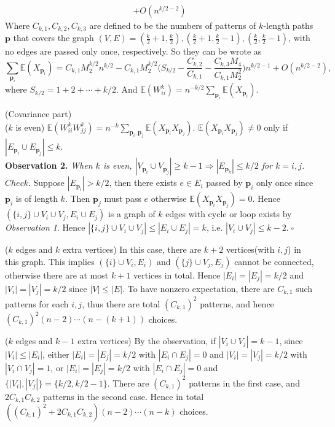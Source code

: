 \begin{answer}
\begin{equation*}
\begin{aligned}
    + O(n^{k/2-2})
\end{aligned}
\end{equation*}
Where $C_{k,1},C_{k,2},C_{k,3}$ are defined to be the numbers of patterns of $k$-length paths $\mathbf{p}$ that covers the graph $(V, E)=(\frac{k}{2}+1,\frac{k}{2}),(\frac{k}{2}+1,\frac{k}{2}-1),(\frac{k}{2},\frac{k}{2}-1)$, with no edges are passed only once, respectively. So they can be wrote as
\begin{equation*}
    \sum_{\mathbf{p}_i}\mathbb{E}(X_{\mathbf{p}_i})=C_{k,1}M_2^{k/2}n^{k/2}-C_{k,1}M_2^{k/2}\Big(S_{k/2}-\frac{C_{k,2}}{C_{k,1}}-\frac{C_{k,3}M_4}{C_{k,1}M_2^2}\Big)n^{k/2-1}+O(n^{k/2-2}),
\end{equation*}
where $S_{k/2}=1+2+\cdots+k/2$. And $\mathbb{E}(W_{ii}^k)=n^{-k/2}\sum_{\mathbf{p}_i}\mathbb{E}(X_{\mathbf{p}_i})$.

(Covariance part)\\
($k$ is even) $\mathbb{E}(W_{ii}^kW_{jj}^k)=n^{-k}\sum_{\mathbf{p}_i,\mathbf{p}_j}\mathbb{E}(X_{\mathbf{p}_i}X_{\mathbf{p}_j})$. $\mathbb{E}(X_{\mathbf{p}_i}X_{\mathbf{p}_j})\neq 0$ only if $|E_{\mathbf{p}_i}\cup E_{\mathbf{p}_j}|\leq k$.\\
\textbf{Observation 2.} \textit{When $k$ is even,  $|V_{\mathbf{p}_i}\cup V_{\mathbf{p}_j}|\geq k-1\Rightarrow|E_{\mathbf{p}_k}|\leq k/2$ for $k=i,j$.}\\
$Check.$ Suppose $|E_{\mathbf{p}_i}|>k/2$, then there exists $e\in E_i$ passed by $\mathbf{p}_i$ only once since $\mathbf{p}_i$ is of length $k$. Then $\mathbf{p}_j$ must pass $e$ otherwise $\mathbb{E}(X_{\mathbf{p}_i}X_{\mathbf{p}_j})=0$. Hence $(\{i,j\}\cup V_i\cup V_j,E_i\cup E_j)$ is a graph of $k$ edges with cycle or loop exists by \textit{Observation 1}. Hence $|\{i,j\}\cup V_i\cup V_j|\leq|E_i\cup E_j|=k$, i.e. $|V_i\cup V_j|\leq k-2.\;\square$

($k$ edges and $k$ extra vertices) In this case, there are $k+2$ vertices(with $i,j$) in this graph. This implies $(\{i\}\cup V_i,E_i)$ and $(\{j\}\cup V_j, E_j)$ cannot be connected, otherwise there are at most $k+1$ vertices in total. Hence $|E_i|=|E_j|=k/2$ and $|V_i|=|V_j|=k/2$ since $|V|\leq|E|$. To have nonzero expectation, there are $C_{k,1}$ such patterns for each $i,j$, thus there are total $(C_{k,1})^2$ patterns, and hence $(C_{k,1})^2(n-2)\cdots(n-(k+1))$ choices.

($k$ edges and $k-1$ extra vertices) By the observation, if $|V_i\cup V_j|=k-1$, since $|V_{i}|\leq |E_{i}|$, either $|E_i|=|E_j|=k/2$ with $|E_i\cap E_j|=0$ and $|V_i|=|V_j|=k/2$ with $|V_i\cap V_j|=1$, or $|E_i|=|E_j|=k/2$ with $|E_i\cap E_j|=0$ and $\{|V_i|,|V_j|\}=\{k/2,k/2-1\}$. There are $(C_{k,1})^2$ patterns in the first case, and $2C_{k,1}C_{k,2}$ patterns in the second case. Hence in total $((C_{k,1})^2+2C_{k,1}C_{k,2})(n-2)\cdots (n-k)$ choices.


\end{answer}
